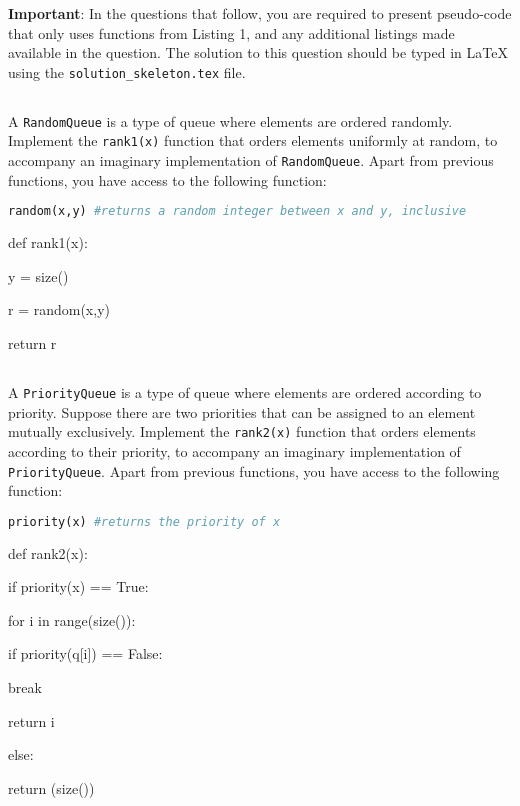 \documentclass[addpoints]{exam}
\begin{document}
	
	\textbf{Important}: In the questions that follow, you are required to present pseudo-code that only uses functions from Listing 1, and any additional listings made available in the question. The solution to this question should be typed in LaTeX using the \texttt{solution\_skeleton.tex} file.
	
	\subsection{} A \texttt{RandomQueue} is a type of queue where elements are ordered randomly. Implement the \texttt{rank1(x)} function that orders elements uniformly at random, to accompany an imaginary implementation of \texttt{RandomQueue}. Apart from previous functions, you have access to the following function:
	\begin{lstlisting}[language=Python]
	random(x,y) #returns a random integer between x and y, inclusive\end{lstlisting}
	
	\begin{mdframed}
		def rank1(x):
    
    y = size()
    
    r = random(x,y)
    
    return r
	\end{mdframed}
	
	\subsection{} A \texttt{PriorityQueue} is a type of queue where elements are ordered according to priority. Suppose there are two priorities that can be assigned to an element mutually exclusively. Implement the \texttt{rank2(x)} function that orders elements according to their priority, to accompany an imaginary implementation of \texttt{PriorityQueue}. Apart from previous functions, you have access to the following function:
	\begin{lstlisting}[language=Python]
	priority(x) #returns the priority of x\end{lstlisting}
	
	\begin{mdframed}
		def rank2(x):
    
    if priority(x) == True:
    
    \hspace*{20pt}for i in range(size()):
    
    \hspace*{40pt}if priority(q[i]) == False:
    
    \hspace*{60pt}break
    
    \hspace*{40pt}return i
    
    else:
    
    
    \hspace*{20pt}return (size())
	\end{mdframed}
	
\end{document}
